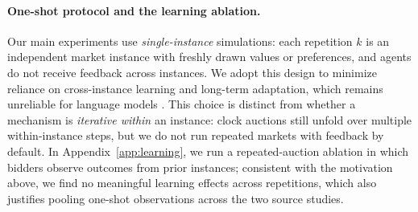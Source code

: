 \paragraph{One-shot protocol and the learning ablation.}
Our main experiments use \emph{single-instance} simulations: each repetition
$k$ is an independent market instance with freshly drawn values or preferences,
and agents do not receive feedback across instances. We adopt this design to
minimize reliance on cross-instance learning and long-term adaptation, which
remains unreliable for language models \citep{dong2024survey}. This choice is
distinct from whether a mechanism is \emph{iterative within} an instance: clock
auctions still unfold over multiple within-instance steps, but
we do not run repeated markets with feedback by default. In
Appendix~\ref{app:learning}, we run a repeated-auction ablation in which
bidders observe outcomes from prior instances; consistent with the motivation
above, we find no meaningful learning effects across repetitions, which also
justifies pooling one-shot observations across the two source studies.

